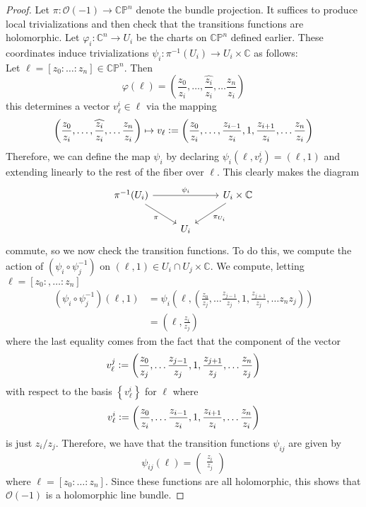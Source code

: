\documentclass[psamsfonts, 12pt]{amsart}
\theoremstyle{definition}
\theoremstyle{remark}
\renewcommand{\O}{\mathscr{O}}
\newcommand{\C}{\mathbb{C}}
\newcommand{\CP}{\mathbb{CP}}
\newcommand{\inv}{^{-1}}
\newcommand{\set}[1]{\left\lbrace #1 \right\rbrace}
\newcommand{\defeq}{\vcentcolon=}
\begin{document}
\begin{proof}
Let $\pi : \O(-1) \to \CP^n$ denote the bundle projection.
It suffices to produce local trivializations and then check that the transitions
functions are holomorphic. Let $\varphi_i : \C^n \to U_i$ be the charts on
$\CP^n$ defined earlier. These coordinates induce trivializations
$\psi_i : \pi\inv(U_i) \to U_i \times \C$ as follows: \\

Let $\ell = [z_0 : \ldots : z_n] \in \CP^n$. Then
\[
\varphi(\ell) = \left(\frac{z_0}{z_i},\ldots,\widehat{\frac{z_i}{z_i}},\ldots
\frac{z_n}{z_i} \right)
\]
this determines a vector $v^i_\ell \in \ell$ via the mapping
\[
\left(\frac{z_0}{z_i},\ldots,\widehat{\frac{z_i}{z_i}},\ldots
\frac{z_n}{z_i} \right) \mapsto v_\ell\defeq
\left(\frac{z_0}{z_i},\ldots,\frac{z_{i-1}}{z_i},1,\frac{z_{i+1}}{z_i},\ldots
\frac{z_n}{z_i} \right)
\]
Therefore, we can define the map $\psi_i$ by declaring $\psi_i(\ell,v^i_\ell) = (\ell,1)$
and extending linearly to the rest of the fiber over $\ell$. This clearly makes
the diagram
\[\begin{tikzcd}
\pi\inv(U_i) \ar[dr, "\pi"']\ar[rr, "\psi_i"] & & U_i \times \C \ar[dl, "\pi_{U_i}"] \\
& U_i
\end{tikzcd}\]
commute, so we now check the transition functions. To do this, we compute the
action of $(\psi_i\circ\psi_j\inv)$ on $(\ell, 1) \in U_i\cap U_j \times \C$. We
compute, letting $\ell = [z_0:,\ldots : z_n]$
\begin{align*}
(\psi_i\circ\psi_j\inv)(\ell, 1)
&= \psi_i\left(\ell, \left( \frac{z_0}{z_j},\ldots
\frac{z_{j-1}}{z_j},1,\frac{z_{j+1}}{z_j},\ldots {z_n}{z_j} \right)\right) \\
&= \left(\ell, \frac{z_i}{z_j}\right)
\end{align*}
where the last equality comes from the fact that the component of the vector
\[
v^j_\ell \defeq \left( \frac{z_0}{z_j},\ldots
\frac{z_{j-1}}{z_j},1,\frac{z_{j+1}}{z_j},\ldots \frac{z_n}{z_j} \right)
\]
with respect to the basis $\set{v^i_\ell}$ for $\ell$ where
\[
v^i_\ell \defeq \left( \frac{z_0}{z_i},\ldots
\frac{z_{i-1}}{z_i},1,\frac{z_{i+1}}{z_i},\ldots \frac{z_n}{z_i} \right)
\]
is just $z_i/z_j$. Therefore, we have that the transition functions $\psi_{ij}$
are given by
\[
\psi_{ij}(\ell) = \begin{pmatrix}
\frac{z_i}{z_j}
\end{pmatrix}
\]
where $\ell = [z_0: \ldots : z_n]$. Since these functions are all holomorphic,
this shows that $\O(-1)$ is a holomorphic line bundle.
\end{proof}
\end{document}
